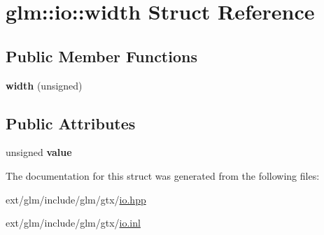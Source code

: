 \hypertarget{structglm_1_1io_1_1width}{\section{glm\-:\-:io\-:\-:width Struct Reference}
\label{structglm_1_1io_1_1width}
}
\subsection*{Public Member Functions}
\begin{DoxyCompactItemize}
\item 
\hypertarget{structglm_1_1io_1_1width_a1576674b7e08dc5014ce4f41ac6eea5b}{{\bfseries width} (unsigned)}\label{structglm_1_1io_1_1width_a1576674b7e08dc5014ce4f41ac6eea5b}

\end{DoxyCompactItemize}
\subsection*{Public Attributes}
\begin{DoxyCompactItemize}
\item 
\hypertarget{structglm_1_1io_1_1width_a6bf1338eb947811d36ec93bd2e9b8425}{unsigned {\bfseries value}}\label{structglm_1_1io_1_1width_a6bf1338eb947811d36ec93bd2e9b8425}

\end{DoxyCompactItemize}


The documentation for this struct was generated from the following files\-:\begin{DoxyCompactItemize}
\item 
ext/glm/include/glm/gtx/\hyperlink{io_8hpp}{io.\-hpp}\item 
ext/glm/include/glm/gtx/\hyperlink{io_8inl}{io.\-inl}\end{DoxyCompactItemize}
